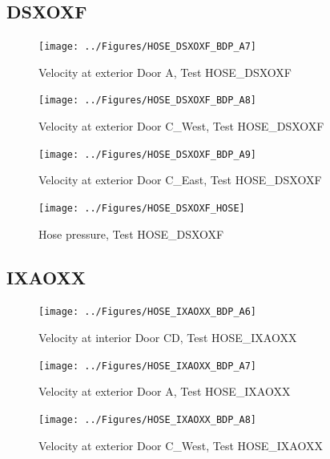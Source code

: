 \documentclass[11pt,oneside]{book}
\begin{document}
\clearpage


\subsection{DSXOXF}

\begin{figure}[!ht]
\texttt{[image: ../Figures/HOSE\_DSXOXF\_BDP\_A7]}
\caption{Velocity at exterior Door A, Test HOSE\_DSXOXF}
\label{fig:HOSE_DSXOXF_BDP_A7}
\end{figure}

\begin{figure}[!ht]
\texttt{[image: ../Figures/HOSE\_DSXOXF\_BDP\_A8]}
\caption{Velocity at exterior Door C\_West, Test HOSE\_DSXOXF}
\label{fig:HOSE_DSXOXF_BDP_A8}
\end{figure}

\begin{figure}[!ht]
\texttt{[image: ../Figures/HOSE\_DSXOXF\_BDP\_A9]}
\caption{Velocity at exterior Door C\_East, Test HOSE\_DSXOXF}
\label{fig:HOSE_DSXOXF_BDP_A9}
\end{figure}

\begin{figure}[!ht]
\texttt{[image: ../Figures/HOSE\_DSXOXF\_HOSE]}
\caption{Hose pressure, Test HOSE\_DSXOXF}
\label{fig:HOSE_DSXOXF_HOSE}
\end{figure}


\clearpage


\subsection{IXAOXX}

\begin{figure}[!ht]
\texttt{[image: ../Figures/HOSE\_IXAOXX\_BDP\_A6]}
\caption{Velocity at interior Door CD, Test HOSE\_IXAOXX}
\label{fig:HOSE_IXAOXX_BDP_A6}
\end{figure}

\begin{figure}[!ht]
\texttt{[image: ../Figures/HOSE\_IXAOXX\_BDP\_A7]}
\caption{Velocity at exterior Door A, Test HOSE\_IXAOXX}
\label{fig:HOSE_IXAOXX_BDP_A7}
\end{figure}

\begin{figure}[!ht]
\texttt{[image: ../Figures/HOSE\_IXAOXX\_BDP\_A8]}
\caption{Velocity at exterior Door C\_West, Test HOSE\_IXAOXX}
\label{fig:HOSE_IXAOXX_BDP_A8}
\end{figure}
\end{document}
